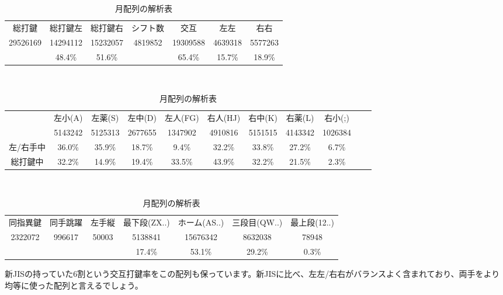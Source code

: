\begin{table}[htbp]
 \caption{月配列の解析表}
 \begin{center}
 \begin{tabular}{cccc|ccc}
 \hline
総打鍵 & 総打鍵左 & 総打鍵右 & シフト数 & 交互 & 左左 & 右右 \\
29526169 & 14294112 & 15232057 & 4819852 & 19309588 & 4639318 & 5577263\\
 & 48.4\% & 51.6\% &  & 65.4\% & 15.7\% & 18.9\%\\
 \hline
 \end{tabular}

 　\vspace{1zw}　

 \begin{tabular}{ccccccccccc}
 \hline
& 左小(A) & 左薬(S) & 左中(D) & 左人(FG) & 右人(HJ) & 右中(K) & 右薬(L) & 右小(;)\\
& 5143242 & 5125313 & 2677655 & 1347902 & 4910816 & 5151515 & 4143342 & 1026384\\
左/右手中 & 36.0\% & 35.9\% & 18.7\% & 9.4\% & 32.2\% & 33.8\% & 27.2\% & 6.7\%\\
総打鍵中 & 32.2\% & 14.9\% & 19.4\% & 33.5\% & 43.9\% & 32.2\% & 21.5\% & 2.3\%\\
\hline
 \end{tabular}

 　\vspace{1zw}　

 \begin{tabular}{ccc|cccc}
 \hline
 同指異鍵 & 同手跳躍 & 左手縦 & 最下段(ZX..) & ホーム(AS..) & 三段目(QW..) & 最上段(12..)\\
2322072 & 996617 & 50003 & 5138841 & 15676342 & 8632038 & 78948\\
 &  &  & 17.4\% & 53.1\% & 29.2\% & 0.3\%\\
\hline
 \end{tabular}
 \end{center}
 \label{tbl:tsuki}
\end{table}


新JISの持っていた6割という交互打鍵率をこの配列も保っています。新JISに比べ、左左/右右がバランスよく含まれており、両手をより均等に使った配列と言えるでしょう。

